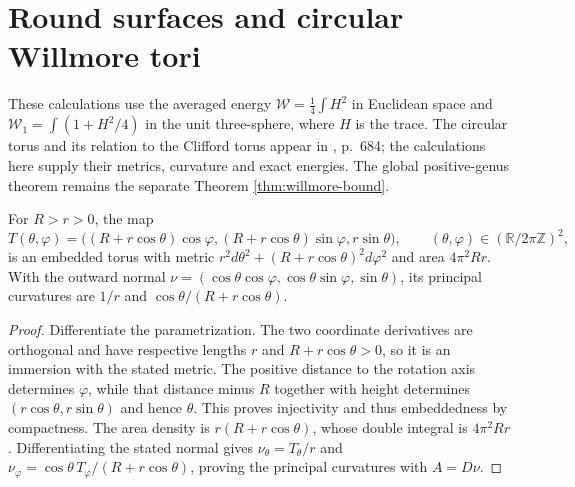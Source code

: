 \chapter{Round surfaces and circular Willmore tori}\label{sec:examples-willmore-tori}
These calculations use the averaged energy $\mathcal W=\frac14\int H^2$ in Euclidean space and $\mathcal W_1=\int(1+H^2/4)$ in the unit three-sphere, where $H$ is the trace. The circular torus and its relation to the Clifford torus appear in \cite{MNWill}, p.~684; the calculations here supply their metrics, curvature and exact energies. The global positive-genus theorem remains the separate Theorem \ref{thm:willmore-bound}.

\begin{proposition}\label{prop:circular-ring-torus-geometry}
For $R>r>0$, the map
\[
 T(\theta,\varphi)=\bigl((R+r\cos\theta)\cos\varphi,
 (R+r\cos\theta)\sin\varphi,r\sin\theta\bigr),
 \qquad (\theta,\varphi)\in(\mathbb R/2\pi\mathbb Z)^2,
\]
is an embedded torus with metric $r^2d\theta^2+(R+r\cos\theta)^2d\varphi^2$ and area $4\pi^2Rr$. With the outward normal
$\nu=(\cos\theta\cos\varphi,\cos\theta\sin\varphi,\sin\theta)$,
its principal curvatures are $1/r$ and $\cos\theta/(R+r\cos\theta)$.
\end{proposition}
\begin{proof}
Differentiate the parametrization. The two coordinate derivatives are orthogonal and have respective lengths $r$ and $R+r\cos\theta>0$, so it is an immersion with the stated metric. The positive distance to the rotation axis determines $\varphi$, while that distance minus $R$ together with height determines $(r\cos\theta,r\sin\theta)$ and hence $\theta$. This proves injectivity and thus embeddedness by compactness. The area density is $r(R+r\cos\theta)$, whose double integral is $4\pi^2Rr$. Differentiating the stated normal gives $\nu_\theta=T_\theta/r$ and $\nu_\varphi=\cos\theta\,T_\varphi/(R+r\cos\theta)$, proving the principal curvatures with $A=D\nu$.
\end{proof}

